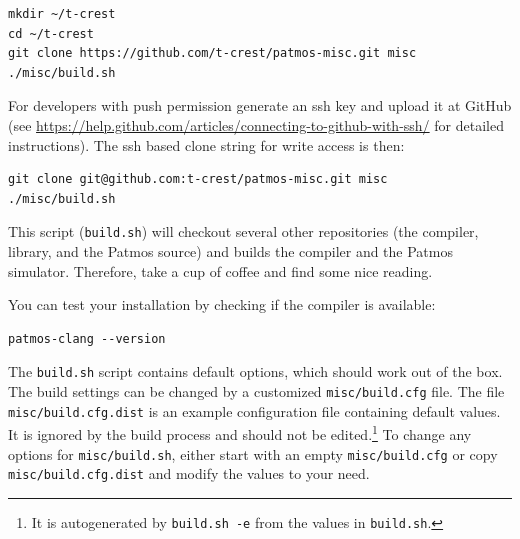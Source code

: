 \documentclass[a4paper,fontsize=10pt,twoside,DIV15,BCOR12mm,headinclude=true,footinclude=false,pagesize,bibtotoc]{scrbook}
\newcommand{\code}[1]{{\texttt{#1}}}
\newcommand{\comment}[3]{

\textsf{\textbf{#1}} {\color{#3}#2}}
\newcommand{\martin}[1]{\comment{Martin}{#1}{Blue}}
\newcommand{\stefan}[1]{\comment{Stefan}{#1}{RoyalPurple}}
\renewcommand{\martin}[1]{}
\renewcommand{\stefan}[1]{}
\begin{document}
\begin{verbatim}
mkdir ~/t-crest
cd ~/t-crest
git clone https://github.com/t-crest/patmos-misc.git misc
./misc/build.sh
\end{verbatim}


For developers with push permission generate an ssh key and upload
it at GitHub (see \url{https://help.github.com/articles/connecting-to-github-with-ssh/}
for detailed instructions).
The ssh based clone string for write access is then:

\begin{verbatim}
git clone git@github.com:t-crest/patmos-misc.git misc
./misc/build.sh
\end{verbatim}

This script (\code{build.sh}) will checkout several other repositories (the compiler, library,
and the Patmos source) and
builds the compiler and the Patmos simulator.
Therefore, take a cup of coffee and find some nice reading.

You can test your installation by checking if the compiler is available:

\begin{verbatim}
patmos-clang --version
\end{verbatim}

The \code{build.sh} script contains default options, which should work out of the box. 
The build settings can be changed by a customized \code{misc/build.cfg} file. The file \code{misc/build.cfg.dist}
is an example configuration file containing default values. It is ignored by the build process and should not be
edited.\footnote{It is autogenerated by \code{build.sh -e} from the values in \code{build.sh}.}
To change any options for \code{misc/build.sh}, either start with an empty \code{misc/build.cfg} or
copy \code{misc/build.cfg.dist} and modify the values to your need.


\martin{In Mac OS X I have only .profile and I don't understand what the issue by 'only read by login terminals'.}
\stefan{Login shells are only opened at logins. Interactive terminals are all terminals that are opened by your window manager or
other means. This is why you need to reboot to have .profile take effect. There are slight differences between bash and zsh when which file is read, 
and distribution further mix up the files in non-standard ways.}

\stefan{Relative paths should actually work, but the \textasciitilde{} shortcut is shell-specific and may not work, but
not sure about this.}
\end{document}
